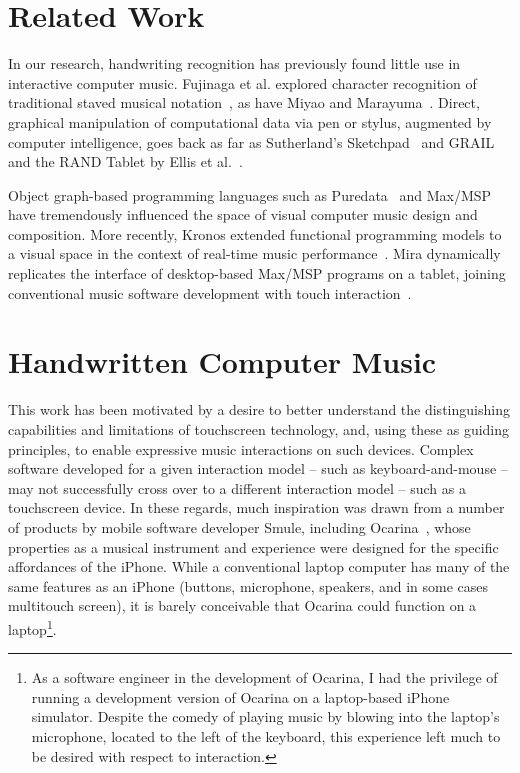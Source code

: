 \documentclass{nime-alternate}
\begin{document}
\section{Related Work}
\label{sec:RelatedWork}


In our research, handwriting recognition has previously found little use in interactive computer music. 
Fujinaga et al. explored character recognition of traditional staved musical notation~\cite{fujinaga1989computer, fujinaga1996exemplar}, as have Miyao and Marayuma~\cite{miyao2007online}. 
Direct, graphical manipulation of computational data via pen or stylus, augmented by computer intelligence, goes back as far as Sutherland's Sketchpad~\cite{sutherland1964sketch} and GRAIL and the RAND Tablet by Ellis et al.~\cite{davis1964rand}. 

Object graph-based programming languages such as Puredata~\cite{puckette1996pure} and Max/MSP~\cite{zicarelli1998extensible} have tremendously influenced the space of visual computer music design and composition. 
More recently, Kronos extended functional programming models to a visual space in the context of real-time music performance~\cite{norilo2012visualization}. 
Mira dynamically replicates the interface of desktop-based Max/MSP programs on a tablet, joining conventional music software development with touch interaction~\cite{tarakajian2013anmira}. 


%
%

\section{Handwritten Computer Music}
\label{sec:HandwrittenComputerMusic}

This work has been motivated by a desire to better understand the distinguishing capabilities and limitations of touchscreen technology, and, using these as guiding principles, to enable expressive music interactions on such devices. 
Complex software developed for a given interaction model -- such as keyboard-and-mouse -- may not successfully cross over to a different interaction model -- such as a touchscreen device. 
In these regards, much inspiration was drawn from a number of products by mobile software developer Smule, including Ocarina~\cite{wang2014ocarina}, whose properties as a musical instrument and experience were designed for the specific affordances of the iPhone. 
While a conventional laptop computer has many of the same features as an iPhone (buttons, microphone, speakers, and in some cases multitouch screen), it is barely conceivable that Ocarina could function on a laptop\footnote{As a software engineer in the development of Ocarina, I had the privilege of running a development version of Ocarina on a laptop-based iPhone simulator. Despite the comedy of playing music by blowing into the laptop's microphone, located to the left of the keyboard, this experience left much to be desired with respect to interaction.}.
\end{document}
